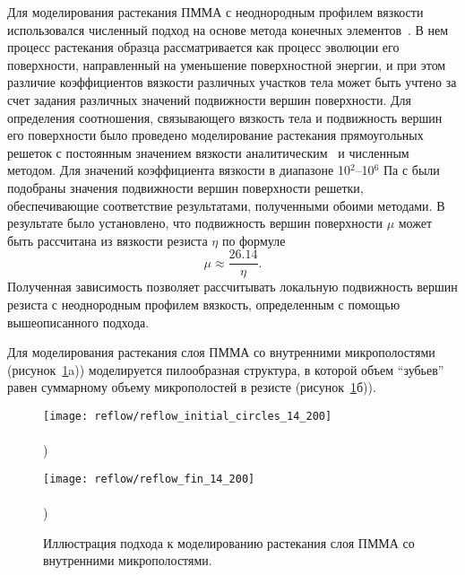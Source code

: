 Для моделирования растекания ПММА с неоднородным профилем вязкости использовался численный подход на основе метода конечных элементов~\cite{Brakke_SE}. В нем процесс растекания образца рассматривается как процесс эволюции его поверхности, направленный на уменьшение поверхностной энергии, и при этом различие коэффициентов вязкости различных участков тела может быть учтено за счет задания различных значений подвижности вершин поверхности. Для определения соотношения, связывающего вязкость тела и подвижность вершин его поверхности было проведено моделирование растекания прямоугольных решеток с постоянным значением вязкости аналитическим~\cite{Leveder_2010} и численным методом. Для значений коэффициента вязкости в диапазоне 10$^{\text{2}}$--10$^{\text{6}}$ Па с были подобраны значения подвижности вершин поверхности решетки, обеспечивающие соответствие результатами, полученными обоими методами. В результате было установлено, что подвижность вершин поверхности $\mu$ может быть рассчитана из вязкости резиста $\eta$ по формуле
\begin{equation}
	\mu \approx \frac{26.14}{\eta}.
\end{equation}
Полученная зависимость позволяет рассчитывать локальную подвижность вершин резиста с неоднородным профилем вязкость, определенным с помощью вышеописанного подхода.

Для моделирования растекания слоя ПММА со внутренними микрополостями (рисунок~\ref{fig:reflow_surface}a)) моделируется пилообразная структура, в которой объем ``зубьев'' равен суммарному объему микрополостей в резисте (рисунок~\ref{fig:reflow_surface}б)).

\begin{figure}[h]
	\begin{minipage}{0.48\textwidth}
		\texttt{[image: reflow/reflow\_initial\_circles\_14\_200]} \\
		\vspace{-28.5ex} \\ ) \\ \vspace{28.5ex}
	\end{minipage}
	\begin{minipage}{0.48\textwidth}
		\texttt{[image: reflow/reflow\_fin\_14\_200]} \\
		\vspace{-28.5ex} \\ ) \\ \vspace{28.5ex}
	\end{minipage}
	\vspace{-3.5em}
	\caption{Иллюстрация подхода к моделированию растекания слоя ПММА со внутренними микрополостями.}
	\label{fig:reflow_surface}
\end{figure}

